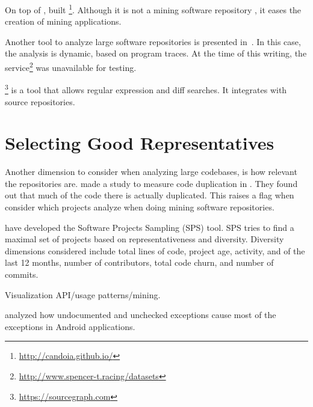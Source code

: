 On top of \boa{}, \cite{tiwari_candoia:_2017} built \candoia \footnote{\url{http://candoia.github.io/}}. 
Although it is not a mining software repository \perse{}, it eases the creation of mining applications. 

Another tool to analyze large software repositories is presented in~\cite{brandauer_spencer:_2017}. 
In this case, the analysis is dynamic, based on program traces. 
At the time of this writing, the service\footnote{\url{http://www.spencer-t.racing/datasets}} was unavailable for testing. 

\sourcegraph{}\footnote{\url{https://sourcegraph.com}} is a tool that allows regular expression and diff searches.
It integrates with source repositories.

\section{Selecting Good Representatives} \label{sec:rw:selection}

Another dimension to consider when analyzing large codebases, is how relevant the repositories are. 
\cite{lopes_dejavu:_2017} made a study to measure code duplication in \github{}. 
They found out that much of the code there is actually duplicated. 
This raises a flag when consider which projects analyze when doing mining software repositories. 

\cite{nagappan_diversity_2013} have developed the Software Projects Sampling (SPS) tool. 
SPS tries to find a maximal set of projects based on representativeness and diversity. 
Diversity dimensions considered include total lines of code, project age, activity, and of the last 12 months, number of contributors, total code churn, and number of commits.

\cite{saied_visualization_2015} Visualization API/usage
patterns/mining.

\cite{kechagia_undocumented_2014} analyzed how undocumented and
unchecked exceptions cause most of the exceptions in
Android applications.
